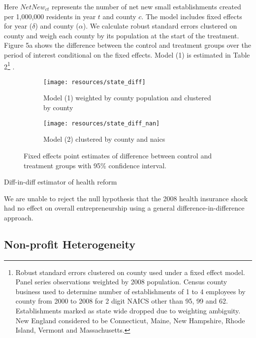 \documentclass[12pt]{article}
\begin{document}
Here $NetNew_{ct}$ represents the number of net new small establishments created per 1,000,000 residents in year $t$ and county $c$. The model includes fixed effects for year ($\delta$) and county ($\alpha$). We calculate robust standard errors clustered on county and weigh each county by its population at the start of the treatment. Figure 5a shows the difference between the control and treatment groups over the period of interest conditional on the fixed effects. Model (1) is estimated in Table 2\footnote{Robust standard errors clustered on county used under a fixed effect model. Panel series observations weighted by 2008 population. Census county business used to determine number of establishments of 1 to 4 employees by county from 2000 to 2008 for 2 digit NAICS other than 95, 99 and 62. Establishments marked as state wide dropped due to weighting ambiguity. New England considered to be Connecticut, Maine, New Hampshire, Rhode Island, Vermont and Massachusetts. } . 

\begin{figure}[H]
	\centering
	\begin{subfigure}[b]{0.495\textwidth}
	    \texttt{[image: resources/state\_diff]}
	    \caption{Model (1) weighted by county population and clustered by county}
	\end{subfigure}
	\begin{subfigure}[b]{0.495\textwidth}
		  \texttt{[image: resources/state\_diff\_nan]}
		  \caption{Model (2) clustered by county and naics}
	\end{subfigure}
	\caption{Fixed effects point estimates of difference between control and treatment groups with 95\% confidence interval.}
\end{figure}

\begin{center}
	\begin{table}[H]		
		\centering
			
		\caption{Diff-in-diff estimator of health reform} 
	\end{table}
\end{center}


We are unable to reject the null hypothesis that the 2008 health insurance shock had no effect on overall entrepreneurship using a general difference-in-difference approach.

\subsection{Non-profit Heterogeneity}
\end{document}
